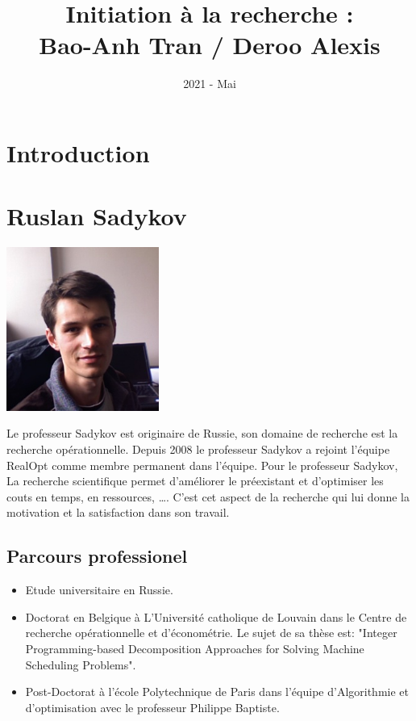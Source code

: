 \documentclass[12pt]{article}
\title{Initiation à la recherche : \\ Bao-Anh Tran / Deroo Alexis}
\date{2021 - Mai}
\begin{document}
    \maketitle
    \tableofcontents
    \newpage

    \section{Introduction}\label{sec:introduction}
    
    \newpage
    \section{Ruslan Sadykov}\label{sec:le-chercheur}

    \begin{center}
        \includegraphics[width=5cm]{image/photo1.jpg}
    \end{center}

    Le professeur Sadykov est originaire de Russie, son domaine de recherche est la recherche opérationnelle. Depuis
    2008 le professeur Sadykov a rejoint l'équipe RealOpt comme membre permanent dans l'équipe. Pour le professeur
    Sadykov, La recherche scientifique permet d'améliorer le préexistant et d'optimiser les couts en temps,
    en ressources, \ldots. C'est cet aspect de la recherche qui lui donne la motivation et la satisfaction dans son
    travail.

    \subsection*{Parcours professionel}\label{subsec:parcours-professionel}

    \begin{itemize}
    \item Etude universitaire en Russie.
    \item Doctorat en Belgique à L'Université catholique de Louvain dans le Centre de recherche opérationnelle et
    d'économétrie.
    Le sujet de sa thèse est: "Integer Programming-based Decomposition Approaches for Solving Machine Scheduling Problems".
    \item Post-Doctorat à l'école Polytechnique de Paris dans l'équipe d'Algorithmie et d'optimisation avec le
    professeur Philippe Baptiste.
    \end{itemize}
\end{document}
